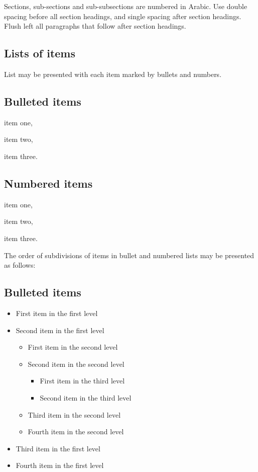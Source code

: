 \documentclass{ws-ijsc}
\begin{document}
Sections, sub-sections and sub-subsections are numbered in Arabic.
Use double spacing before all section headings, and single spacing
after section headings. Flush left all paragraphs that follow after
section headings.

\subsection{Lists of items}

List may be presented with each item marked by bullets and numbers.

\subsection*{Bulleted items}

\begin{itemlist}
 \item item one,
 \item item two,
 \item item three.
\end{itemlist}

\subsection*{Numbered items}

\begin{arabiclist}
 \item item one,
 \item item two,
 \item item three.
\end{arabiclist}

The order of subdivisions of items in bullet and numbered lists
may be presented as follows:

\subsection*{Bulleted items}

\begin{itemize}
\item First item in the first level
\item Second item in the first level
\begin{itemize}
\item First item in the second level 
\item Second item in the second level
\begin{itemize}
\item First item in the third level 
\item Second item in the third level
\end{itemize}
\item Third item in the second level
\item Fourth item in the second level
\end{itemize}
\item Third item in the first level
\item Fourth item in the first level
\end{itemize}
\end{document}
